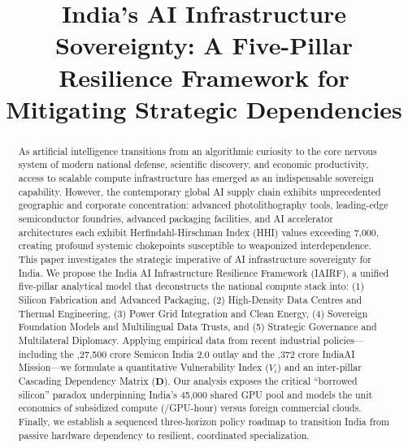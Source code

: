 \documentclass[conference,a4paper]{IEEEtran}
\begin{document}
\title{India's AI Infrastructure Sovereignty: A Five-Pillar Resilience Framework for Mitigating Strategic Dependencies}

\author{
}

\maketitle

\begin{abstract}
As artificial intelligence transitions from an algorithmic curiosity to the core nervous system of modern national defense, scientific discovery, and economic productivity, access to scalable compute infrastructure has emerged as an indispensable sovereign capability. However, the contemporary global AI supply chain exhibits unprecedented geographic and corporate concentration: advanced photolithography tools, leading-edge semiconductor foundries, advanced packaging facilities, and AI accelerator architectures each exhibit Herfindahl-Hirschman Index (HHI) values exceeding 7,000, creating profound systemic chokepoints susceptible to weaponized interdependence. This paper investigates the strategic imperative of AI infrastructure sovereignty for India. We propose the India AI Infrastructure Resilience Framework (IAIRF), a unified five-pillar analytical model that deconstructs the national compute stack into: (1) Silicon Fabrication and Advanced Packaging, (2) High-Density Data Centres and Thermal Engineering, (3) Power Grid Integration and Clean Energy, (4) Sovereign Foundation Models and Multilingual Data Trusts, and (5) Strategic Governance and Multilateral Diplomacy. Applying empirical data from recent industrial policies—including the ,27,500 crore Semicon India 2.0 outlay and the ,372 crore IndiaAI Mission—we formulate a quantitative Vulnerability Index ($V_i$) and an inter-pillar Cascading Dependency Matrix ($\mathbf{D}$). Our analysis exposes the critical ``borrowed silicon'' paradox underpinning India's 45,000 shared GPU pool and models the unit economics of subsidized compute (/GPU-hour) versus foreign commercial clouds. Finally, we establish a sequenced three-horizon policy roadmap to transition India from passive hardware dependency to resilient, coordinated specialization.
\end{abstract}
\end{document}
